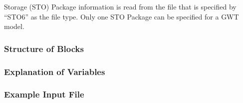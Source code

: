 Storage (STO) Package information is read from the file that is specified by ``STO6'' as the file type.  Only one STO Package can be specified for a GWT model. 

\vspace{5mm}
\subsubsection{Structure of Blocks}



\vspace{5mm}
\subsubsection{Explanation of Variables}
\begin{description}

\end{description}

\vspace{5mm}
\subsubsection{Example Input File}


